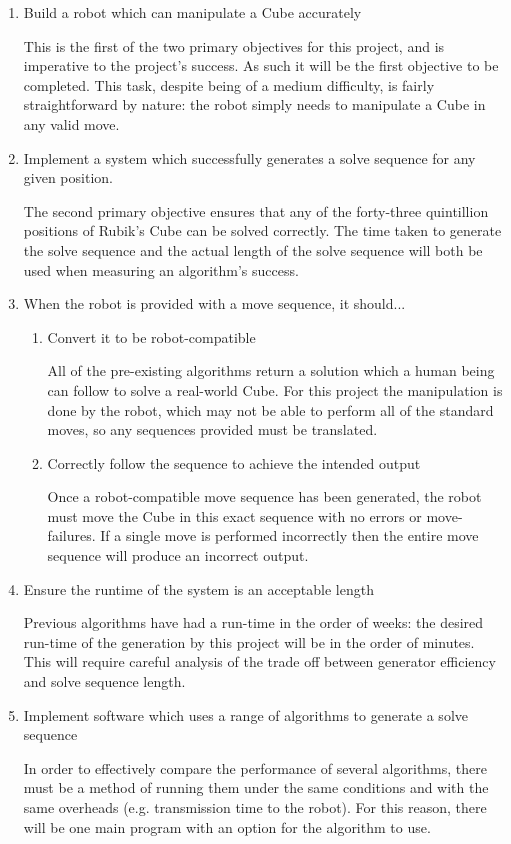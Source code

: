 \documentclass{report}
\begin{document}
    \begin{enumerate}
    	\item Build a robot which can manipulate a Cube accurately \par This is the first of the two primary objectives for this project, and is imperative to the project's success. As such it will be the first objective to be completed. This task, despite being of a medium difficulty, is fairly straightforward by nature: the robot simply needs to manipulate a Cube in any valid move.
    	\item Implement a system which successfully generates a solve sequence for any given position. \par The second primary objective ensures that any of the forty-three quintillion positions of Rubik's Cube can be solved correctly. The time taken to generate the solve sequence and the actual length of the solve sequence will both be used when measuring an algorithm's success.
    	\item When the robot is provided with a move sequence, it should...
    	\begin{enumerate}
    		\item Convert it to be robot-compatible \par All of the pre-existing algorithms return a solution which a human being can follow to solve a real-world Cube. For this project the manipulation is done by the robot, which may not be able to perform all of the standard moves, so any sequences provided must be translated.
    		\item Correctly follow the sequence to achieve the intended output \par Once a robot-compatible move sequence has been generated, the robot must move the Cube in this exact sequence with no errors or move-failures. If a single move is performed incorrectly then the entire move sequence will produce an incorrect output.
    	\end{enumerate}
    	\item Ensure the runtime of the system is an acceptable length \par Previous algorithms have had a run-time in the order of weeks: the desired run-time of the generation by this project will be in the order of minutes. This will require careful analysis of the trade off between generator efficiency and solve sequence length.
    	\item Implement software which uses a range of algorithms to generate a solve sequence \par In order to effectively compare the performance of several algorithms, there must be a method of running them under the same conditions and with the same overheads (e.g. transmission time to the robot). For this reason, there will be one main program with an option for the algorithm to use.

\end{enumerate}
\end{document}
